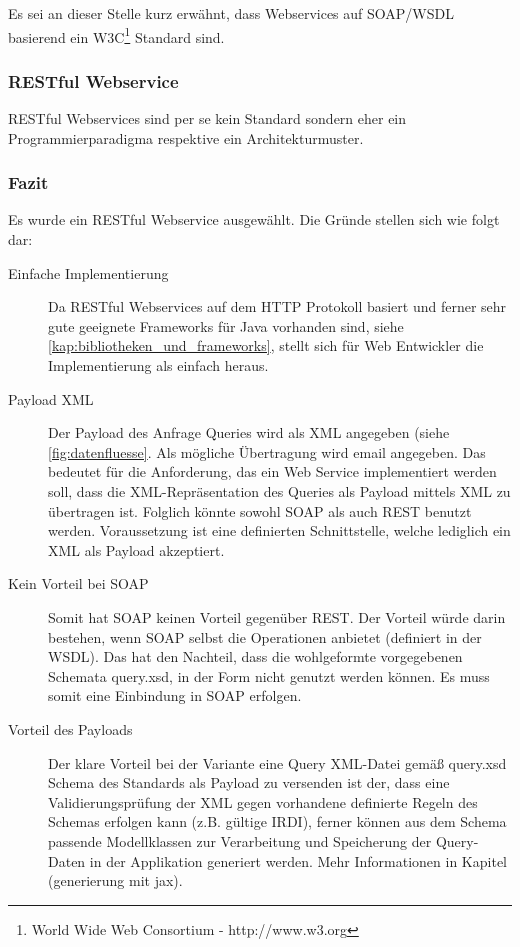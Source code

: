 Es sei an dieser Stelle kurz erwähnt, dass Webservices auf SOAP/WSDL basierend ein W3C\footnote{World Wide Web Consortium - http://www.w3.org} Standard sind. 

\subsubsection{RESTful Webservice}  
RESTful Webservices sind per se kein Standard sondern eher ein Programmierparadigma respektive ein Architekturmuster. 

\subsubsection{Fazit}
Es wurde ein RESTful Webservice ausgewählt. Die Gründe stellen sich wie folgt dar:

\begin{description}
\item[Einfache Implementierung] Da RESTful Webservices auf dem HTTP Protokoll basiert und ferner sehr gute geeignete Frameworks für Java vorhanden sind, siehe \autoref{kap:bibliotheken_und_frameworks}, stellt sich für Web Entwickler die Implementierung als einfach heraus.
\item[Payload XML] Der Payload des Anfrage Queries wird als XML angegeben (siehe \autoref{fig:datenfluesse}. Als mögliche Übertragung wird email angegeben. Das bedeutet für die Anforderung, das ein Web Service  implementiert werden soll, dass die XML-Repräsentation des Queries als Payload mittels XML zu übertragen ist. Folglich könnte sowohl SOAP als auch REST benutzt werden. Voraussetzung ist eine definierten Schnittstelle, welche lediglich ein XML als Payload akzeptiert. 
\item[Kein Vorteil bei SOAP] Somit hat SOAP keinen Vorteil gegenüber REST. Der Vorteil würde darin bestehen, wenn SOAP selbst die Operationen anbietet (definiert in der WSDL). Das hat den Nachteil, dass die wohlgeformte vorgegebenen Schemata query.xsd, in der Form nicht genutzt werden können. Es muss somit eine Einbindung in SOAP erfolgen. 
\item[Vorteil des Payloads] Der klare Vorteil bei der Variante eine Query XML-Datei gemäß query.xsd Schema des Standards als Payload zu versenden ist der, dass eine Validierungsprüfung der XML gegen vorhandene definierte Regeln des Schemas erfolgen kann (z.B. gültige IRDI), ferner können aus dem Schema passende Modellklassen zur Verarbeitung und Speicherung der Query-Daten in der Applikation generiert werden. Mehr Informationen in Kapitel  (generierung mit jax). 
\end{description}

